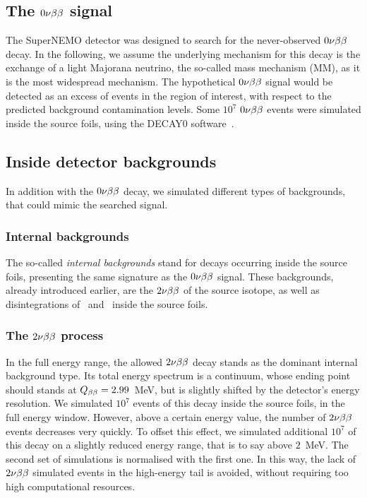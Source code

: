 
\subsection{The $0\nu\beta\beta$ signal}

The SuperNEMO detector was designed to search for the never-observed $0\nu\beta\beta$ decay.
In the following, we assume the underlying mechanism for this decay is the exchange of a light Majorana neutrino, the so-called mass mechanism (MM), as it is the most widespread mechanism.
The hypothetical $0\nu\beta\beta$ signal would be detected as an excess of events in the region of interest, with respect to the predicted background contamination levels.
Some $10^{7}$ $0\nu\beta\beta$ events were simulated inside the source foils, using the DECAY$0$ software~\cite{art:decay0}.

\subsection{Inside detector backgrounds}

In addition with the $0\nu\beta\beta$ decay, we simulated different types of backgrounds, that could mimic the searched signal.

\subsubsection{Internal backgrounds}

The so-called \emph{internal backgrounds} stand for decays occurring inside the source foils, presenting the same signature as the $0\nu\beta\beta$ signal.
These backgrounds, already introduced earlier, are the $2\nu\beta\beta$ of the source isotope, as well as disintegrations of \Tl\ and \Bi\ inside the source foils.

\subsubsection*{The $2\nu\beta\beta$ process}

In the full energy range, the allowed $2\nu\beta\beta$ decay stands as the dominant internal background type.
Its total energy spectrum is a continuum, whose ending point should stands at $Q_{\beta\beta} = 2.99$~MeV, but is slightly shifted by the detector's energy resolution.
We simulated $10^{7}$ events of this decay inside the source foils, in the full energy window.
However, above a certain energy value, the number of $2\nu\beta\beta$ events decreases very quickly.
To offset this effect, we simulated additional $10^{7}$ of this decay on a slightly reduced energy range, that is to say above $2$~MeV.
The second set of simulations is normalised with the first one.
In this way, the lack of $2\nu\beta\beta$ simulated events in the high-energy tail is avoided, without requiring too high computational resources.

